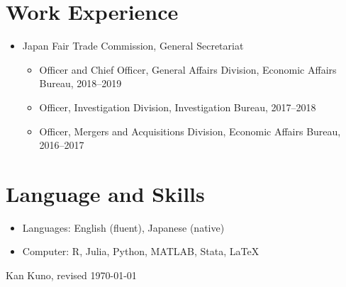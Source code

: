 \documentclass[11pt]{article}
\begin{document}
\section*{Work Experience}
\begin{itemize}
\item Japan Fair Trade Commission, General Secretariat
  \begin{itemize}
  \item Officer and Chief Officer, General Affairs Division, Economic Affairs Bureau, 2018--2019
  \item Officer, Investigation Division, Investigation Bureau, 2017--2018
  \item Officer, Mergers and Acquisitions Division, Economic Affairs Bureau, 2016--2017
  \end{itemize}
\end{itemize}

\section*{Language and Skills}
\begin{itemize}
\item Languages: English (fluent), Japanese (native)
\item Computer: R, Julia, Python, MATLAB, Stata, \LaTeX
\end{itemize}

\vfill
\noindent Kan Kuno, revised \today
\end{document}
